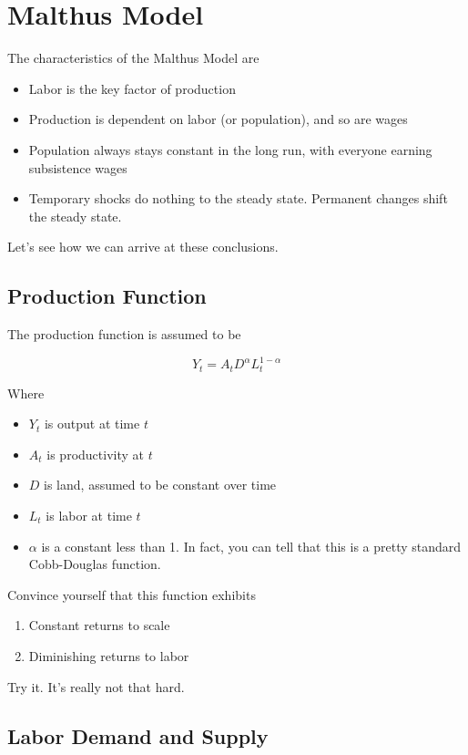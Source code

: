 \documentclass[11pt]{scrartcl}
\begin{document}
\section{Malthus Model}

The characteristics of the Malthus Model are

\begin{itemize}
\item Labor is the key factor of production
\item Production is dependent on labor (or population), and so are wages
\item Population always stays constant in the long run, with everyone earning subsistence wages
\item Temporary shocks do nothing to the steady state. Permanent changes shift the steady state.
\end{itemize}

Let's see how we can arrive at these conclusions.

\subsection{Production Function}

The production function is assumed to be

\[Y_t = A_tD^\alpha L_t^{1-\alpha}\]

Where 

\begin{itemize}
\item $Y_t$ is output at time $t$
\item $A_t$ is productivity at $t$
\item $D$ is land, assumed to be constant over time
\item $L_t$ is labor at time $t$
\item $\alpha$ is a constant less than 1. In fact, you can tell that this is a pretty standard Cobb-Douglas function.
\end{itemize}

Convince yourself that this function exhibits

\begin{enumerate}
\item Constant returns to scale
\item Diminishing returns to labor
\end{enumerate}

Try it. It's really not that hard.

\subsection{Labor Demand and Supply}
\end{document}
